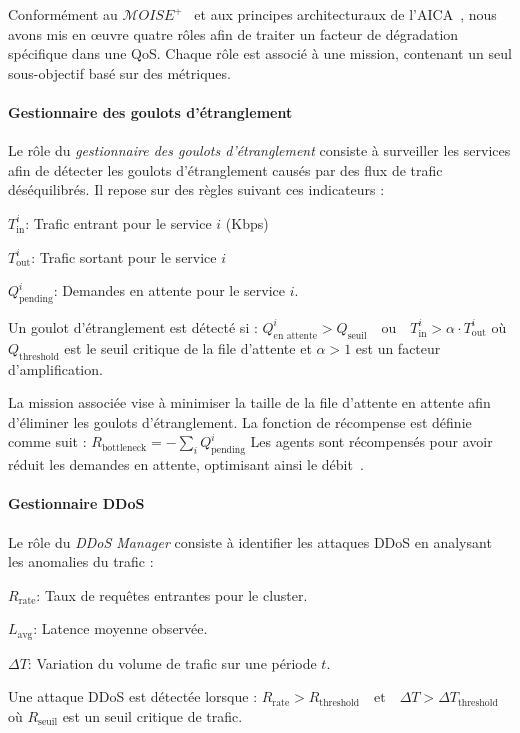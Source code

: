\noindent Conformément au $\mathcal{M}OISE^+$~\cite{hubner2002moise} et aux principes architecturaux de l'AICA~\cite{kott2018autonomous}, nous avons mis en œuvre quatre rôles afin de traiter un facteur de dégradation spécifique dans une QoS.
Chaque rôle est associé à une mission, contenant un seul sous-objectif basé sur des métriques.

\noindent \paragraph{\textbf{Gestionnaire des goulots d'étranglement}} 
%
Le rôle du \textit{gestionnaire des goulots d'étranglement} consiste à surveiller les services afin de détecter les goulots d'étranglement causés par des flux de trafic déséquilibrés. Il repose sur des règles suivant ces indicateurs :
\begin{enumerate*}[label={}, itemjoin={;\quad }]
    \item \( T_{\text{in}}^i \): Trafic entrant pour le service \( i \) (Kbps)
    \item \( T_{\text{out}}^i \): Trafic sortant pour le service \( i \)
    \item \( Q_{\text{pending}}^i \): Demandes en attente pour le service \( i \).
\end{enumerate*}
Un goulot d'étranglement est détecté si : $Q_{\text{en attente}}^i > Q_{\text{seuil}} \quad \text{ou} \quad T_{\text{in}}^i > \alpha \cdot T_{\text{out}}^i$
où \( Q_{\text{threshold}} \) est le seuil critique de la file d'attente et \( \alpha > 1 \) est un facteur d'amplification.

La mission associée vise à minimiser la taille de la file d'attente en attente afin d'éliminer les goulots d'étranglement. La fonction de récompense est définie comme suit : $R_{\text{bottleneck}} = - \sum_{i} Q_{\text{pending}}^i$
Les agents sont récompensés pour avoir réduit les demandes en attente, optimisant ainsi le débit~\cite{burns2016borg}.

\noindent \paragraph{\textbf{Gestionnaire DDoS}}

Le rôle du \textit{DDoS Manager} consiste à identifier les attaques DDoS en analysant les anomalies du trafic :
\begin{enumerate*}[label={}, itemjoin={;\quad }]
    \item \( R_{\text{rate}} \): Taux de requêtes entrantes pour le cluster.
    \item \( L_{\text{avg}} \): Latence moyenne observée.
    \item \( \Delta T \): Variation du volume de trafic sur une période \( t \).
\end{enumerate*}
Une attaque DDoS est détectée lorsque :
$R_{\text{rate}} > R_{\text{threshold}} \quad \text{et} \quad \Delta T > \Delta T_{\text{threshold}}$
où \( R_{\text{seuil}} \) est un seuil critique de trafic.

